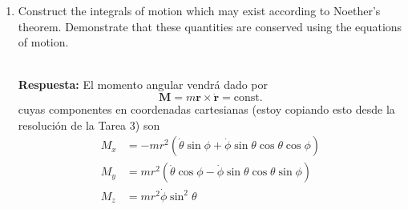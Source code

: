 \documentclass[]{article}
\numberwithin{equation}{section}
\newcommand{\0}{\textcolor{gray}{0}}
\newcommand{\rv}{\mathbf{r}}
\newcommand{\n}[1]{\mathbf{#1}}
\newcommand{\resp}{
	\\
	
	\textbf{Respuesta:} }
\begin{document}
\begin{enumerate}
	\item[(b)] Construct the integrals of motion which may exist according to Noether's theorem. Demonstrate that these quantities are conserved using the equations of motion.
	\resp El momento angular vendrá dado por
	\begin{equation}
		\n{M} = m\rv\times\dot{\rv} = \mathrm{const.}
	\end{equation}
	cuyas componentes en coordenadas cartesianas (estoy copiando esto desde la resolución de la Tarea 3) son
	\begin{align*}
		M_x &= -m r^2 \left( \dot{\theta}\sin\phi + \dot{\phi}\sin\theta\cos\theta\cos\phi \right)\\
		M_y &= m r^2 \left( \dot{\theta}\cos\phi - \dot{\phi}\sin\theta\cos\theta\sin\phi \right)\\
		M_z &= m r^2 \dot{\phi} \sin^2\theta
	\end{align*}
	

\end{enumerate}
\end{document}
